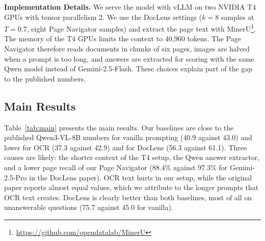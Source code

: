 \documentclass[conference]{IEEEtran}
\begin{document}
\textbf{Implementation Details.} We serve the model with vLLM \cite{kwon2023vllm} on two NVIDIA T4 GPUs with tensor parallelism 2. We use the DocLens settings ($k=8$ samples at $T=0.7$, eight Page Navigator samples) and extract the page text with MinerU\footnote{\url{https://github.com/opendatalab/MinerU}}. The memory of the T4 GPUs limits the context to 40,960 tokens. The Page Navigator therefore reads documents in chunks of six pages, images are halved when a prompt is too long, and answers are extracted for scoring with the same Qwen model instead of Gemini-2.5-Flash. These choices explain part of the gap to the published numbers.

\subsection{Main Results}
\label{sec:main}
Table~\ref{tab:main} presents the main results. Our baselines are close to the published Qwen3-VL-8B numbers for vanilla prompting (40.9 against 43.0) and lower for OCR (37.3 against 42.9) and for DocLens (56.3 against 61.1). Three causes are likely: the shorter context of the T4 setup, the Qwen answer extractor, and a lower page recall of our Page Navigator (88.4\% against 97.3\% for Gemini-2.5-Pro in the DocLens paper). OCR text hurts in our setup, while the original paper reports almost equal values, which we attribute to the longer prompts that OCR text creates. DocLens is clearly better than both baselines, most of all on unanswerable questions (75.7 against 45.0 for vanilla).
\end{document}
